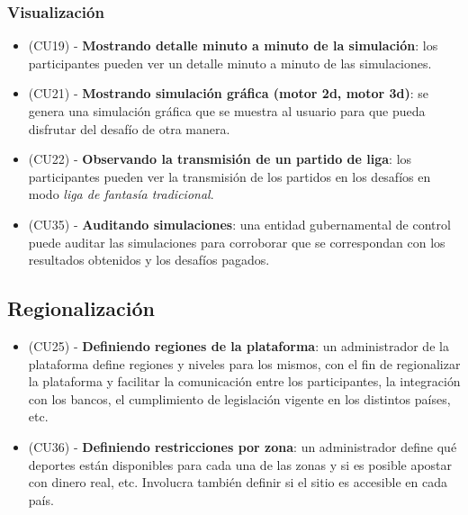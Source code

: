 \subsubsection{Visualización}
\begin{itemize}
\item (CU19) - \textbf{Mostrando detalle minuto a minuto de la simulación}: los participantes pueden ver un detalle minuto a minuto de las simulaciones.
\item (CU21) - \textbf{Mostrando simulación gráfica (motor 2d, motor 3d)}: se genera una simulación gráfica que se muestra al usuario para que pueda disfrutar del desafío de otra manera.
\item (CU22) - \textbf{Observando la transmisión de un partido de liga}: los participantes pueden ver la transmisión de los partidos en los desafíos en modo \emph{liga de fantasía tradicional}.
\item (CU35) - \textbf{Auditando simulaciones}: una entidad gubernamental de control puede auditar las simulaciones para corroborar que se correspondan con los resultados obtenidos y los desafíos pagados.
\end{itemize}


\subsection{Regionalización}
\begin{itemize}
\item (CU25) - \textbf{Definiendo regiones de la plataforma}: un administrador de la plataforma define regiones y niveles para los mismos, con el fin de regionalizar la plataforma y facilitar la comunicación entre los participantes, la integración con los bancos, el cumplimiento de legislación vigente en los distintos países, etc.
\item (CU36) - \textbf{Definiendo restricciones por zona}: un administrador define qué deportes están disponibles para cada una de las zonas y si es posible apostar con dinero real, etc. Involucra también definir si el sitio es accesible en cada país.
\end{itemize}






